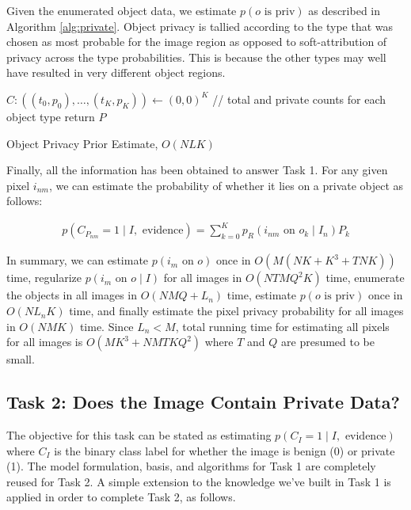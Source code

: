 \documentclass[11pt]{article}
\begin{document}
Given the enumerated object data, we estimate $p(o \textrm{ is priv})$ as described in Algorithm \ref{alg:private}.  Object privacy is tallied according to the type that was chosen as most probable for the image region as opposed to soft-attribution of privacy across the type probabilities.  This is because the other types may well have resulted in very different object regions.

\begin{algorithm}[htp!]\label{alg:private}
	$C: ((t_0, p_0), \dots, (t_K, p_K)) \leftarrow (0,0)^K$ // total and private counts for each object type\;
	return $P$\;
\caption{Object Privacy Prior Estimate, $O(NL  K)$}
\end{algorithm}

Finally, all the information has been obtained to answer Task 1.  For any given pixel $i_{nm}$, we can estimate the probability of whether it lies on a private object as follows:

\begin{align}
    p(C_{P_{nm}} = 1 \mid I, \textrm{ evidence}) = \sum_{k=0}^{K} p_R(i_{nm} \textrm{ on } o_k \mid I_n) P_k
\end{align}

In summary, we can estimate $p(i_m \textrm{ on } o)$ once in $O(M(NK + K^3 + TNK))$ time, regularize $p(i_m \textrm{ on } o \mid I)$ for all images in $O(NTMQ^2K)$ time, enumerate the objects in all images in $O(NMQ + L_n)$  time, estimate $p(o \textrm{ is priv})$ once in $O(N L_n K)$ time, and finally estimate the pixel privacy probability for all images in $O(N M K)$ time.  Since $L_n < M$, total running time for estimating all pixels for all images is $O(MK^3 + NMTKQ^2)$ where $T$ and $Q$ are presumed to be small.


\subsection{Task 2: Does the Image Contain Private Data?}

The objective for this task can be stated as estimating $p(C_I = 1 \mid I, \textrm{ evidence})$ where $C_I$ is the binary class label for whether the image is benign (0) or private (1).  The model formulation, basis, and algorithms for Task 1 are completely reused for Task 2.  A simple extension to the knowledge we've built in Task 1 is applied in order to complete Task 2, as follows.
\end{document}
